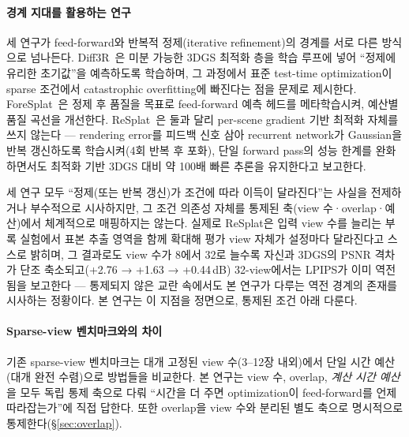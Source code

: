 \paragraph{경계 지대를 활용하는 연구} 세 연구가 feed-forward와 반복적 정제(iterative refinement)의 경계를 서로 다른 방식으로 넘나든다. Diff3R~\cite{liu2026diff3r}은 미분 가능한 3DGS 최적화 층을 학습 루프에 넣어 ``정제에 유리한 초기값''을 예측하도록 학습하며, 그 과정에서 표준 test-time optimization이 sparse 조건에서 catastrophic overfitting에 빠진다는 점을 문제로 제시한다. ForeSplat~\cite{li2026foresplat}은 정제 후 품질을 목표로 feed-forward 예측 헤드를 메타학습시켜, 예산별 품질 곡선을 개선한다. ReSplat~\cite{xu2026resplat}은 둘과 달리 per-scene gradient 기반 최적화 자체를 쓰지 않는다 — rendering error를 피드백 신호 삼아 recurrent network가 Gaussian을 반복 갱신하도록 학습시켜(4회 반복 후 포화), 단일 forward pass의 성능 한계를 완화하면서도 최적화 기반 3DGS 대비 약 100배 빠른 추론을 유지한다고 보고한다.

세 연구 모두 ``정제(또는 반복 갱신)가 조건에 따라 이득이 달라진다''는 사실을 전제하거나 부수적으로 시사하지만, 그 조건 의존성 자체를 통제된 축(view 수·overlap·예산)에서 체계적으로 매핑하지는 않는다. 실제로 ReSplat은 입력 view 수를 늘리는 부록 실험에서 표본 추출 영역을 함께 확대해 평가 view 자체가 설정마다 달라진다고 스스로 밝히며, 그 결과로도 view 수가 8에서 32로 늘수록 자신과 3DGS의 PSNR 격차가 단조 축소되고(+2.76 → +1.63 → +0.44\,dB) 32-view에서는 LPIPS가 이미 역전됨을 보고한다 — 통제되지 않은 교란 속에서도 본 연구가 다루는 역전 경계의 존재를 시사하는 정황이다. 본 연구는 이 지점을 정면으로, 통제된 조건 아래 다룬다.

\paragraph{Sparse-view 벤치마크와의 차이} 기존 sparse-view 벤치마크는 대개 고정된 view 수(3--12장 내외)에서 단일 시간 예산(대개 완전 수렴)으로 방법들을 비교한다. 본 연구는 view 수, overlap, \emph{계산 시간 예산}을 모두 독립 통제 축으로 다뤄 ``시간을 더 주면 optimization이 feed-forward를 언제 따라잡는가''에 직접 답한다. 또한 overlap을 view 수와 분리된 별도 축으로 명시적으로 통제한다(\S\ref{sec:overlap}).
